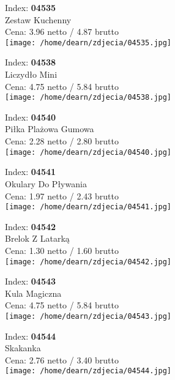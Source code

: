 {Index: \textbf{04535}\\
Zestaw Kuchenny\\
Cena: 3.96 netto / 4.87 brutto\\
  \texttt{[image: /home/dearn/zdjecia/04535.jpg]}}\newline\newline

{Index: \textbf{04538}\\
Liczydło Mini\\
Cena: 4.75 netto / 5.84 brutto\\
  \texttt{[image: /home/dearn/zdjecia/04538.jpg]}}\newline\newline

{Index: \textbf{04540}\\
Piłka Plażowa Gumowa\\
Cena: 2.28 netto / 2.80 brutto\\
  \texttt{[image: /home/dearn/zdjecia/04540.jpg]}}\newline\newline

{Index: \textbf{04541}\\
Okulary Do Pływania\\
Cena: 1.97 netto / 2.43 brutto\\
  \texttt{[image: /home/dearn/zdjecia/04541.jpg]}}\newline\newline

{Index: \textbf{04542}\\
Brelok Z Latarką\\
Cena: 1.30 netto / 1.60 brutto\\
  \texttt{[image: /home/dearn/zdjecia/04542.jpg]}}\newline\newline

{Index: \textbf{04543}\\
Kula Magiczna\\
Cena: 4.75 netto / 5.84 brutto\\
  \texttt{[image: /home/dearn/zdjecia/04543.jpg]}}\newline\newline

{Index: \textbf{04544}\\
Skakanka \\
Cena: 2.76 netto / 3.40 brutto\\
  \texttt{[image: /home/dearn/zdjecia/04544.jpg]}}\newline\newline


